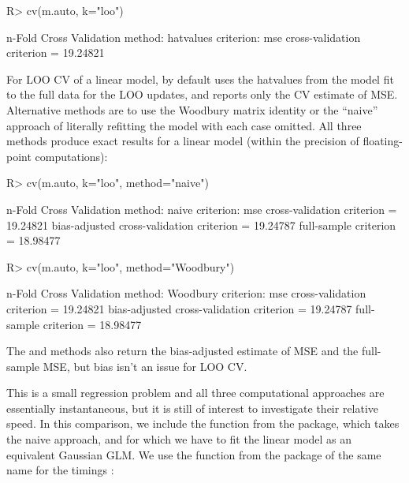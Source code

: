 \documentclass[
]{jss}
\begin{document}
\begin{CodeChunk}
\begin{CodeInput}
R> cv(m.auto, k="loo")
\end{CodeInput}
\begin{CodeOutput}
n-Fold Cross Validation
method: hatvalues
criterion: mse
cross-validation criterion = 19.24821
\end{CodeOutput}
\end{CodeChunk}

For LOO CV of a linear model,  by default uses the hatvalues
from the model fit to the full data for the LOO updates, and reports
only the CV estimate of MSE. Alternative methods are to use the Woodbury
matrix identity or the ``naive'' approach of literally refitting the
model with each case omitted. All three methods produce exact results
for a linear model (within the precision of floating-point
computations):

\begin{CodeChunk}
\begin{CodeInput}
R> cv(m.auto, k="loo", method="naive")
\end{CodeInput}
\begin{CodeOutput}
n-Fold Cross Validation
method: naive
criterion: mse
cross-validation criterion = 19.24821
bias-adjusted cross-validation criterion = 19.24787
full-sample criterion = 18.98477 
\end{CodeOutput}
\begin{CodeInput}
R> cv(m.auto, k="loo", method="Woodbury")
\end{CodeInput}
\begin{CodeOutput}
n-Fold Cross Validation
method: Woodbury
criterion: mse
cross-validation criterion = 19.24821
bias-adjusted cross-validation criterion = 19.24787
full-sample criterion = 18.98477 
\end{CodeOutput}
\end{CodeChunk}

The  and  methods also return the
bias-adjusted estimate of MSE and the full-sample MSE, but bias isn't an
issue for LOO CV.

This is a small regression problem and all three computational
approaches are essentially instantaneous, but it is still of interest to
investigate their relative speed. In this comparison, we include the
 function from the  package, which takes the
naive approach, and for which we have to fit the linear model as an
equivalent Gaussian GLM. We use the  function
from the package of the same name for the timings \citep{Mersmann:2023}:
\end{document}
